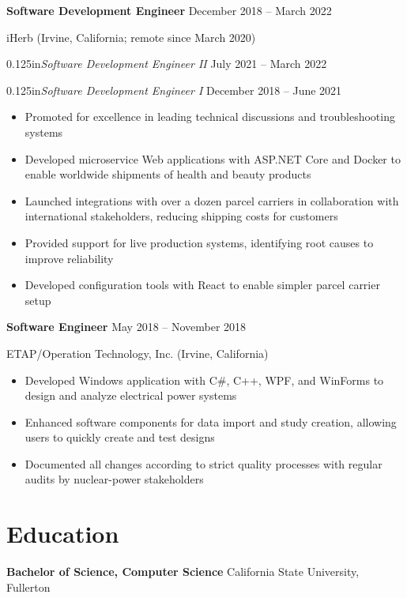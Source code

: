 \documentclass[12pt]{article}
\newcommand{\titleheader}[2]{\textbf{#1} \symbol{"B7} #2}
\newcommand{\secondaryheader}[2]{\begin{adjustwidth}{0.125in}{}\textit{#1} \symbol{"B7} #2\end{adjustwidth}}
\newcommand{\locheader}[2]{#1 (#2)}
\begin{document}
	\titleheader{Software Development Engineer}{December 2018 -- March 2022}

	\locheader{iHerb}{Irvine, California; remote since March 2020}

	\secondaryheader{Software Development Engineer II}{July 2021 -- March 2022}

	\secondaryheader{Software Development Engineer I}{December 2018 -- June 2021}

	\begin{itemize}
		\item Promoted for excellence in leading technical discussions and troubleshooting systems
		\item Developed microservice Web applications with ASP.NET Core and Docker to enable worldwide shipments of health and beauty products
		\item Launched integrations with over a dozen parcel carriers in collaboration with international stakeholders, reducing shipping costs for customers
		\item Provided support for live production systems, identifying root causes to improve reliability
		\item Developed configuration tools with React to enable simpler parcel carrier setup
	\end{itemize}

	\titleheader{Software Engineer}{May 2018 -- November 2018}

	\locheader{ETAP/Operation Technology, Inc.}{Irvine, California}

	\begin{itemize}
		\item Developed Windows application with C\#, C++, WPF, and WinForms to design and analyze electrical power systems
		\item Enhanced software components for data import and study creation, allowing users to quickly create and test designs
		\item Documented all changes according to strict quality processes with regular audits by nuclear-power stakeholders
	\end{itemize}

	\section*{Education}

	\textbf{Bachelor of Science, Computer Science}  California State University, Fullerton
\end{document}
